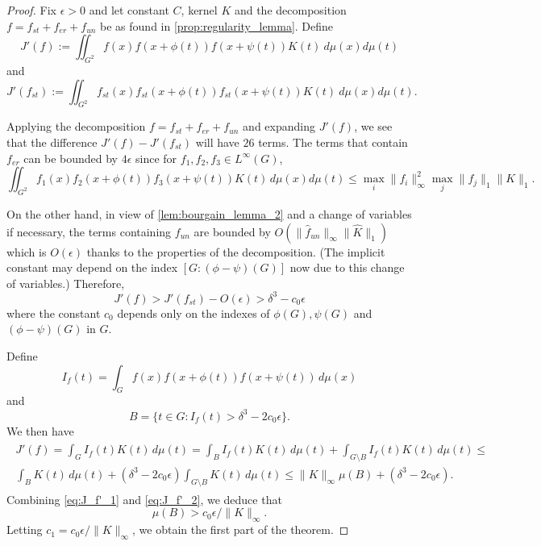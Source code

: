 \documentclass[10pt]{article}
\theoremstyle{definition}
\begin{document}
\begin{proof}
    Fix $\epsilon > 0$ and let constant $C$, kernel $K$ and the decomposition $f = f_{st} + f_{er} + f_{un}$ be as found in \cref{prop:regularity_lemma}. Define
    \[
        J'(f) := \iint_{G^2} f(x) f(x+ \phi(t)) f(x+ \psi(t)) K(t) \ d\mu(x) d\mu(t)
    \]
    and 
    \[
        J'(f_{st}) := \iint_{G^2} f_{st}(x) f_{st}(x + \phi(t)) f_{st}(x + \psi(t)) K(t)\ d\mu(x) d\mu(t).
    \]
    
    Applying the decomposition $f = f_{st} + f_{er} + f_{un}$ and expanding $J'(f)$, we see that the difference $J'(f) - J'(f_{st})$ will have $26$ terms. The terms that contain $f_{er}$ can be bounded by $4 \epsilon$ since for $f_1, f_2, f_3 \in L^{\infty}(G)$,
    \begin{equation*}
        \iint_{G^2} f_1(x) f_2(x + \phi(t)) f_3(x + \psi(t)) K(t) \, d\mu(x) d\mu(t) \leq \max_{i} \lVert f_i \rVert_{\infty}^2 \max_{j} \lVert f_j \rVert_1 \lVert K \rVert_1.
    \end{equation*}
    
    On the other hand, in view of \cref{lem:bourgain_lemma_2} and a change of variables if necessary, the terms containing $f_{un}$ are bounded by $O(\lVert \hat{f}_{un} \rVert_{\infty} \lVert \widehat{K} \rVert_{1})$ which is $O(\epsilon)$ thanks to the properties of the decomposition. (The implicit constant may depend on the index $[G:(\phi - \psi)(G)]$ now due to this change of variables.)
    Therefore,
    \begin{equation}
    \label{eq:J_f'_1}
        J'(f) > J'(f_{st}) - O(\epsilon) > \delta^3 - c_0 \epsilon
    \end{equation}
    where the constant $c_0$ depends only on the indexes of $\phi(G), \psi(G)$ and $(\phi - \psi)(G)$ in $G$. 
    
    Define
    \begin{equation*}
        I_f(t) = \int_G f(x) f(x+ \phi(t)) f(x+ \psi(t)) \, d\mu(x)
    \end{equation*}
    and 
    \begin{equation*}
        B = \{t \in G: I_f(t) > \delta^3 - 2 c_0 \epsilon \}. 
    \end{equation*}
    We then have
    \begin{align}
    \label{eq:J_f'_2}
    \begin{aligned}
        J'(f) = \int_G I_f(t) K(t) \, d\mu(t) = \int_B I_f(t) K(t) \, d\mu(t) + \int_{G \setminus B} I_f(t) K(t) \, d\mu(t) \leq \\ \int_B K(t) \, d\mu(t) + (\delta^3 - 2 c_0 \epsilon) \int_{G \setminus B} K(t) \, d\mu(t) \leq 
        \lVert K \rVert_{\infty} \mu(B) + (\delta^3 - 2 c_0 \epsilon).
    \end{aligned}
    \end{align}
    Combining \eqref{eq:J_f'_1} and \eqref{eq:J_f'_2}, we deduce that 
    \begin{equation*}
        \mu(B) > c_0 \epsilon/\lVert K \rVert_{\infty}.
    \end{equation*}
    Letting $c_1 = c_0 \epsilon/\lVert K \rVert_{\infty}$, we obtain the first part of the theorem. 
    

\end{proof}
\end{document}
